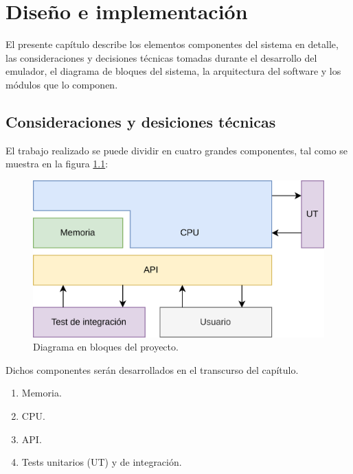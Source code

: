 \chapter{Diseño e implementación} %
\label{Chapter3}

El presente capítulo describe los elementos componentes del sistema en detalle, las consideraciones y decisiones técnicas tomadas durante el desarrollo del emulador, el diagrama de bloques del sistema, la arquitectura del software y los módulos que lo componen.



\section{Consideraciones y desiciones técnicas}
\label{sec:consideraciones_decisiones_tecnicas}

El trabajo realizado se puede dividir en cuatro grandes componentes, tal como se muestra en la figura \ref{fig:diagrama_bloques}:

\begin{figure}[htbp]
	\centering
	\includegraphics[width=.85\textwidth]{./Figures/diagrama_bloques}
	\caption{Diagrama en bloques del proyecto.}
	\label{fig:diagrama_bloques}
\end{figure}

Dichos componentes serán desarrollados en el transcurso del capítulo.

\begin{enumerate}
\item Memoria.
\item CPU.
\item API.
\item Tests unitarios (UT) y de integración.
\end{enumerate}

